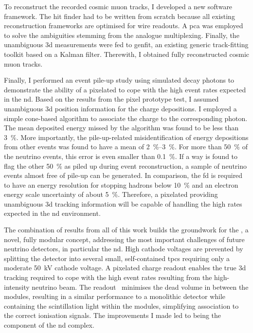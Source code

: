 To reconstruct the recorded cosmic muon tracks, I developed a new software framework.
The hit finder had to be written from scratch because all existing \lartpc{} reconstruction frameworks are optimised for wire readouts.
A \gls{pca} was employed to solve the ambiguities stemming from the analogue multiplexing.
Finally, the unambiguous \gls{3d} measurements were fed to \gls{genfit}, an existing generic track-fitting toolkit based on a Kalman filter.
Therewith, I obtained fully reconstructed cosmic muon tracks.

Finally, I performed an event pile-up study using simulated \Pgpz decay photons to demonstrate the ability of a pixelated \lartpc{} to cope with the high event rates expected in the \dune{} \gls{nd}.
Based on the results from the pixel prototype test, I assumed unambiguous \gls{3d} position information for the charge depositions.
I employed a simple cone-based algorithm to associate the charge to the corresponding photon.
The mean deposited energy missed by the algorithm was found to be less than \SI{3}{\percent}.
More importantly, the pile-up-related misidentification of energy depositions from other events was found to have a mean of \SIrange{2}{3}{\percent}.
For more than \SI{50}{\percent} of the neutrino events, this error is even smaller than \SI{0.1}{\percent}.
If a way is found to flag the other \SI{50}{\percent} as piled up during event reconstruction, a sample of neutrino events almost free of pile-up can be generated.
In comparison, the \gls{fd} is required to have an energy resolution for stopping hadrons below \SI{10}{\percent} and an electron energy scale uncertainty of about \SI{5}{\percent}.
Therefore, a pixelated \lartpc{} providing unambiguous \gls{3d} tracking information will be capable of handling the high rates expected in the \dune{} \gls{nd} environment.

The combination of results from all of this work builds the groundwork for the \AC{}, a novel, fully modular \lartpc{} concept, addressing the most important challenges of future neutrino detectors, in particular the \dune{} \gls{nd}.
High cathode voltages are prevented by splitting the detector into several small, self-contained \glspl{tpc} requiring only a moderate \SI{50}{\kilo\volt} cathode voltage.
A pixelated charge readout enables the true \gls{3d} tracking required to cope with the high event rates resulting from the high-intensity neutrino beam.
The \AL{} readout~\cite{arclight} minimises the dead volume in between the modules, resulting in a similar performance to a monolithic detector while containing the scintillation light within the modules, simplifying association to the correct ionisation signals.
The improvements I made led to \AC{} being the \lar{} component of the \dune{} \gls{nd} complex.